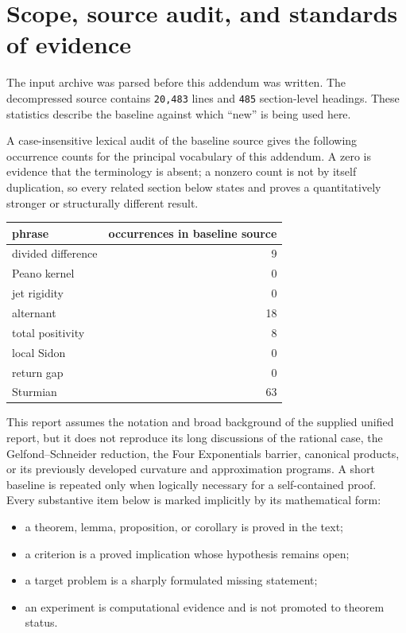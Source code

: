 \documentclass[11pt]{article}
\theoremstyle{definition}
\theoremstyle{remark}
\begin{document}
\tableofcontents
\newpage

\section{Scope, source audit, and standards of evidence}

The input archive was parsed before this addendum was written. The decompressed source contains
\texttt{20,483} lines and \texttt{485} section-level headings. These statistics describe the
baseline against which ``new'' is being used here.


A case-insensitive lexical audit of the baseline source gives the following occurrence counts for the principal vocabulary of this addendum. A zero is evidence that the terminology is absent; a nonzero count is not by itself duplication, so every related section below states and proves a quantitatively stronger or structurally different result.

\begin{center}
\small
\begin{tabular}{@{}lr@{}}
\toprule
phrase & occurrences in baseline source\\
\midrule
divided difference & 9 \\
Peano kernel & 0 \\
jet rigidity & 0 \\
alternant & 18 \\
total positivity & 8 \\
local Sidon & 0 \\
return gap & 0 \\
Sturmian & 63 \\
\bottomrule
\end{tabular}
\end{center}

This report assumes the notation and broad background of the supplied unified report, but it does not reproduce its long discussions of the rational case, the Gelfond--Schneider reduction, the Four Exponentials barrier, canonical products, or its previously developed curvature and approximation programs. A short baseline is repeated only when logically necessary for a self-contained proof. Every substantive item below is marked implicitly by its mathematical form:
\begin{itemize}
\item a theorem, lemma, proposition, or corollary is proved in the text;
\item a criterion is a proved implication whose hypothesis remains open;
\item a target problem is a sharply formulated missing statement;
\item an experiment is computational evidence and is not promoted to theorem status.
\end{itemize}
\end{document}
